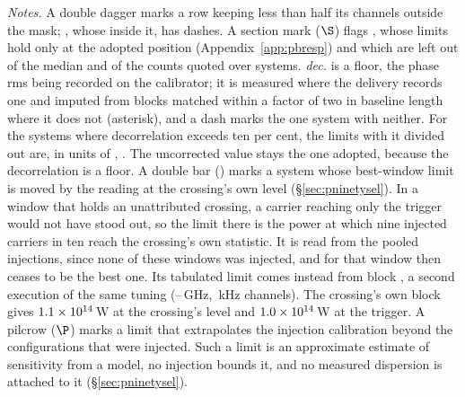 \begin{table}
\centering
\caption{\textbf{Per-system sensitivity of the carrier search.} For each of
the \NSysClassA{} systems the fine-channel search covers, the
$\mathrm{EIRP}_{90}$ of its best window, retentions applied, in order of
the limit down the left half and then down the right half. Columns and
marks: Appendix~\ref{app:persys} and the notes below.}
\label{tab:persys}
\footnotesize


{\footnotesize\raggedright \emph{Notes.} A double dagger marks a row
keeping less than half its channels outside the mask; \NSysALostName, whose
\UmALostWinClause{} inside it, has dashes. A section mark
($\S$) flags \OmFlagStars, whose limits hold only at the adopted position
(Appendix~\ref{app:pbresp}) and which are left out of the median and of
the counts quoted over systems.
\emph{dec.} is a floor, the phase rms being recorded on the calibrator; it
is measured where the delivery records one and imputed from blocks matched
within a factor of two in baseline length where it does not (asterisk), and
a dash marks the one system with neither. For the \DcNBigTab{}
systems where decorrelation exceeds ten per cent\DcBigCondClause, the limits with it divided
out are, in units of \DcCorrUnit, \DcCorrClause. The uncorrected value stays
the one adopted, because the decorrelation is a floor.
A double bar (\XwMark) marks a system whose best-window limit is moved by
the reading at the crossing's own level (\S\ref{sec:pninetysel}). In a window
that holds an unattributed crossing, a carrier reaching only the trigger
would not have stood out, so the limit there is the power at which nine
injected carriers in ten reach the crossing's own statistic. It is read
from the pooled injections, since none of these windows was injected, and
for \XwSwitchNames{} that window then ceases to be the best one. Its
tabulated limit comes instead from block \NtSwBestEb, a second execution of
the same tuning (\NtSwBestLoGHz--\NtSwBestHiGHz\,GHz, \NtSwBestChanKHz\,kHz
channels). The crossing's own block gives $1.1\times10^{14}$\,W at the
crossing's level and $1.0\times10^{14}$\,W at the trigger.
A pilcrow ($\P$) marks a limit that extrapolates the injection calibration
beyond the configurations that were injected. Such a limit is an
approximate estimate of sensitivity from a model, no injection bounds it,
and no measured dispersion is attached to it (\S\ref{sec:pninetysel}).\par}
\end{table}
